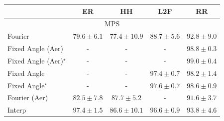\begin{tabular}{l|cccc|}
\toprule
            & ER & HH & L2F & RR \\
\midrule
\multicolumn{5}{c}{\rule{0pt}{8pt}MPS} \\
\midrule
Fourier & {\cellcolor[HTML]{FFF8C4}} \color[HTML]{000000} $79.6\pm 6.1$ & {\cellcolor[HTML]{FFFFE5}} \color[HTML]{000000} $77.4\pm 10.9$ & {\cellcolor[HTML]{FB9225}} \color[HTML]{000000} $88.7\pm 5.6$ & {\cellcolor[HTML]{D55607}} \color[HTML]{F1F1F1} $92.8\pm 9.0$ \\
Fixed Angle (Aer) & {\cellcolor[HTML]{000000}} \color[HTML]{F1F1F1} {\cellcolor{white}} \color{black} - & {\cellcolor[HTML]{000000}} \color[HTML]{F1F1F1} {\cellcolor{white}} \color{black} - & {\cellcolor[HTML]{000000}} \color[HTML]{F1F1F1} {\cellcolor{white}} \color{black} - & {\cellcolor[HTML]{692606}} \color[HTML]{F1F1F1} $98.8\pm 0.3$ \\
Fixed Angle (Aer)$^\star$ & {\cellcolor[HTML]{000000}} \color[HTML]{F1F1F1} {\cellcolor{white}} \color{black} - & {\cellcolor[HTML]{000000}} \color[HTML]{F1F1F1} {\cellcolor{white}} \color{black} - & {\cellcolor[HTML]{000000}} \color[HTML]{F1F1F1} {\cellcolor{white}} \color{black} - & {\cellcolor[HTML]{662506}} \color[HTML]{F1F1F1} $99.0\pm 0.4$ \\
Fixed Angle & {\cellcolor[HTML]{000000}} \color[HTML]{F1F1F1} {\cellcolor{white}} \color{black} - & {\cellcolor[HTML]{000000}} \color[HTML]{F1F1F1} {\cellcolor{white}} \color{black} - & {\cellcolor[HTML]{832D05}} \color[HTML]{F1F1F1} $97.4\pm 0.7$ & {\cellcolor[HTML]{742905}} \color[HTML]{F1F1F1} $98.2\pm 1.4$ \\
Fixed Angle$^\star$ & {\cellcolor[HTML]{000000}} \color[HTML]{F1F1F1} {\cellcolor{white}} \color{black} - & {\cellcolor[HTML]{000000}} \color[HTML]{F1F1F1} {\cellcolor{white}} \color{black} - & {\cellcolor[HTML]{802D05}} \color[HTML]{F1F1F1} $97.6\pm 0.7$ & {\cellcolor[HTML]{6C2706}} \color[HTML]{F1F1F1} $98.6\pm 0.9$ \\
Fourier (Aer) & {\cellcolor[HTML]{FEE596}} \color[HTML]{000000} $82.5\pm 7.8$ & {\cellcolor[HTML]{FEA030}} \color[HTML]{000000} $87.7\pm 5.2$ & {\cellcolor[HTML]{000000}} \color[HTML]{F1F1F1} {\cellcolor{white}} \color{black} - & {\cellcolor[HTML]{E3660F}} \color[HTML]{F1F1F1} $91.6\pm 3.7$ \\
Interp & {\cellcolor[HTML]{832D05}} \color[HTML]{F1F1F1} $97.4\pm 1.5$ & {\cellcolor[HTML]{FEB23F}} \color[HTML]{000000} $86.6\pm 10.1$ & {\cellcolor[HTML]{933204}} \color[HTML]{F1F1F1} $96.6\pm 0.9$ & {\cellcolor[HTML]{C84A02}} \color[HTML]{F1F1F1} $93.8\pm 4.6$ \\

\end{tabular}
